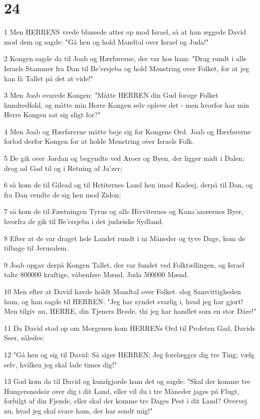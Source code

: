 \chapter{24}

\par 1 Men HERRENS vrede blussede atter op mod Israel, så at han æggede David mod dem og sagde: "Gå hen og hold Mandtal over Israel og Juda!"
\par 2 Kongen sagde da til Joab og Hærførerne, der var hos ham: "Drag rundt i alle Israels Stammer fra Dan til Be'ersjeba og hold Mønstring over Folket, for at jeg kan få Tallet på det at vide!"
\par 3 Men Joab svarede Kongen: "Måtte HERREN din Gud forøge Folket hundredfold, og måtte min Herre Kongen selv opleve det - men hvorfor har min Herre Kongen sat sig sligt for?"
\par 4 Men Joab og Hærførerne måtte bøje sig for Kongens Ord. Joab og Hærførerne forlod derfor Kongen for at holde Mønstring over Israels Folk.
\par 5 De gik over Jordan og begyndte ved Aroer og Byen, der ligger midt i Dalen; drog ad Gad til og i Retning af Ja'zer;
\par 6 så kom de til Gilead og til Hetiternes Land hen imod Kadesj, derpå til Dan, og fra Dan vendte de sig hen mod Zidon;
\par 7 så kom de til Fæstningen Tyrus og alle Hivviternes og Kana'anæernes Byer, hvorfra de gik til Be'ersjeba i det judæiske Sydland.
\par 8 Efter at de var draget hele Landet rundt i ni Måneder og tyve Dage, kom de tilbage til Jerusalem.
\par 9 Joab opgav derpå Kongen Tallet, der var fundet ved Folktællingen, og Israel talte 800000 kraftige, våbenføre Mænd, Juda 500000 Mænd.
\par 10 Men efter at David havde holdt Mandtal over Folket. slog Samvittigheden ham, og han sagde til HERREN: "Jeg har syndet svarlig i, hvad jeg har gjort! Men tilgiv nu, HERRE, din Tjeners Brøde, thi jeg har handlet som en stor Dåre!"
\par 11 Da David stod op om Morgenen kom HERRENs Ord til Profeten Gad, Davids Seer, således:
\par 12 "Gå hen og sig til David: Så siger HERREN; Jeg forelægger dig tre Ting; vælg selv, hvilken jeg skal lade times dig!"
\par 13 Gad kom da til David og kundgjorde ham det og sagde: "Skal der komme tre Hungersnødsår over dig i dit Land, eller vil du i tre Måneder jages på Flugt, forfulgt af din Fjende, eller skal der komme tre Dages Pest i dit Land? Overvej nu, hvad jeg skal svare ham, der har sendt mig!"
